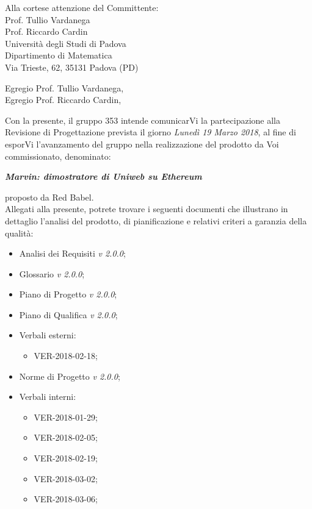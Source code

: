 \documentclass[openany, a4paper, 12pt]{letter}
\newcommand{\vrdue}{\textit{v 2.0.0}\xspace} %
\begin{document}
	
	\begin{letter}{
			Alla cortese attenzione del Committente:\\
			\smallskip
			Prof. Tullio Vardanega\\
			Prof. Riccardo Cardin\\
			\medskip
			Università degli Studi di Padova \\
			Dipartimento di Matematica\\
			Via Trieste, 62, 35131 Padova (PD)}
		\opening{Egregio Prof. Tullio Vardanega, \\
			Egregio Prof. Riccardo Cardin,}
		\thispagestyle{plain}
		Con la presente, il gruppo 353 intende comunicarVi la partecipazione alla Revisione di Progettazione prevista il giorno \textit{Lunedì 19 Marzo 2018}, al fine di esporVi l'avanzamento del gruppo nella realizzazione del prodotto da Voi commissionato, denominato: \\
		\begin{center}
			\emph{\textbf{Marvin: dimostratore di Uniweb su Ethereum}}\medskip \\
		\end{center}
		proposto da Red Babel.\medskip\\
		Allegati alla presente, potrete trovare i seguenti documenti che illustrano in dettaglio l'analisi del
		prodotto, di pianificazione e relativi criteri a garanzia della qualità: 
		\begin{itemize}
			\item Analisi dei Requisiti \vrdue;
			\item Glossario \vrdue;
			\item Piano di Progetto \vrdue;
			\item Piano di Qualifica \vrdue;
			\item Verbali esterni:
			\begin{itemize}
				\item VER-2018-02-18;
			\end{itemize}
			\item Norme di Progetto \vrdue;
			\item Verbali interni:
			\begin{itemize}
				\item VER-2018-01-29;
				\item VER-2018-02-05;
				\item VER-2018-02-19;
				\item VER-2018-03-02;
				\item VER-2018-03-06;
			\end{itemize}
		\end{itemize}
		

\end{letter}
\end{document}
